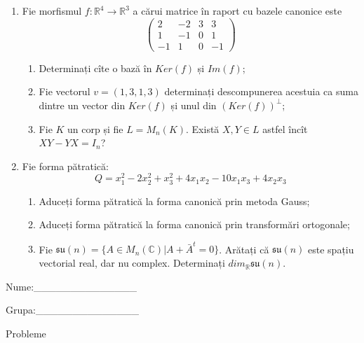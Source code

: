 \documentclass{article}
\begin{document}
\begin{enumerate}
 \item Fie morfismul $f:\mathbb{R}^4 \to \mathbb{R}^3$ a cărui matrice în raport cu bazele canonice este
$$\begin{pmatrix}
2&-2&3&3\\
1&-1&0&1\\
-1&1&0&-1
\end{pmatrix}$$

\begin{enumerate}
\item Determinați cîte o bază în $Ker(f)$ și $Im(f)$;
\item Fie vectorul $v=(1,3,1,3)$ determinați descompunerea acestuia ca suma dintre un vector din $Ker(f)$ și unul din $(Ker(f))^\perp$;
\item Fie $K$ un corp și fie $L=M_n(K)$. Există $X,Y \in L$ astfel încît $XY-YX=I_n$?  
\end{enumerate}
\item Fie forma pătratică:
$$Q= x_1^2-2x_2^2+x_3^2+4x_1x_2-10x_1x_3+4x_2x_3$$

\begin{enumerate}
\item Aduceți forma pătratică la forma canonică prin metoda Gauss;
\item Aduceți forma pătratică la forma canonică prin transformări ortogonale;
\item Fie $\mathfrak{su}(n)=\{ A \in M_n(\mathbb{C}) | A+\bar{A}^t=0\}$. Arătați că $\mathfrak{su}(n)$ este spațiu vectorial real, dar nu complex.
Determinați $dim_{\mathbb{R}}\mathfrak{su}(n)$.
\end{enumerate}
\end{enumerate}
\newpage
\begin{flushright}
Nume:\_\_\_\_\_\_\_\_\_\_\_\_\_\_
 
 
Grupa:\_\_\_\_\_\_\_\_\_\_\_\_\_\_
\end{flushright}
\begin{center}
\vspace{2cm}
{\Large Probleme}
\vspace{2cm}
\end{center}
\end{document}
